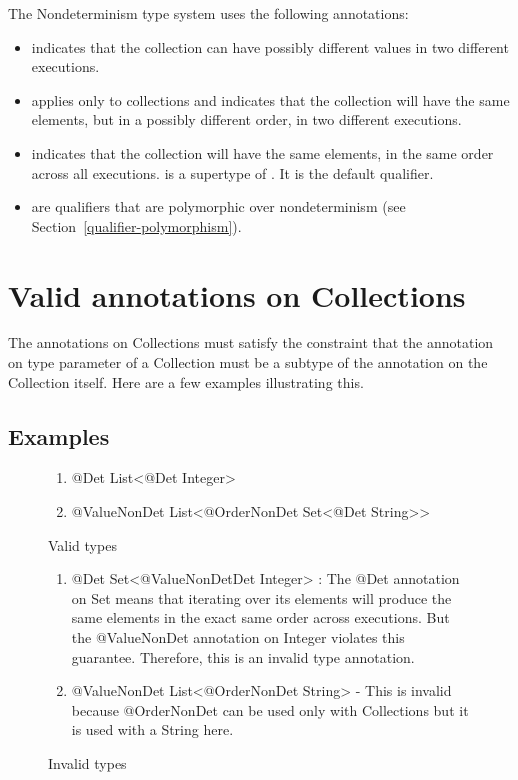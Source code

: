The Nondeterminism type system uses the following annotations:
\begin{itemize}
\item
   indicates
  that the collection can have possibly different values in two different executions.
\item
   applies only to
  collections and indicates that the collection will have the same
  elements, but in a possibly different order, in two different
  executions.
 \item
   indicates that
  the collection will have the same elements, in the same order across all executions.
   is a supertype of .
   It is the default qualifier.
\item
   are qualifiers that are
  polymorphic over nondeterminism (see Section~\ref{qualifier-polymorphism}).
\end{itemize}


\section{Valid annotations on Collections\label{nondeterminism-type-validity}}
The annotations on Collections must satisfy the constraint that the annotation on type parameter of a Collection must be a
subtype of the annotation on the Collection itself. Here are a few examples illustrating this.

\subsection{Examples\label{nondeterminism-examples}}
\begin{figure}
	\begin{enumerate}
		\item @Det List<@Det Integer> 
		\item @ValueNonDet List<@OrderNonDet Set<@Det String>> 
	\end{enumerate}
\caption{Valid types}
\end{figure}

\begin{figure}
	\begin{enumerate}
		\item @Det Set<@ValueNonDetDet Integer> : The @Det annotation on Set means that iterating over its elements will produce the same elements in the exact same order across executions. But the @ValueNonDet annotation on Integer violates this guarantee. Therefore, this is an invalid type annotation.
		\item @ValueNonDet List<@OrderNonDet String> - This is invalid because @OrderNonDet can be used only with Collections but it is used with a String here.
	\end{enumerate}
\caption{Invalid types}
\end{figure}

